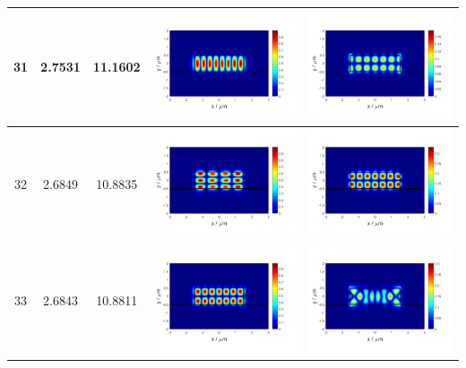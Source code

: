 \documentclass{assignment}
\begin{document}
\begin{sol}
\begin{itemize}
\begin{longtable}[c]{|c|c|c|c|c|}
            31 & 2.7531 & 11.1602 & \includegraphics[width=.3\columnwidth]{Assignment-2-mode-31-Ex.png} & \includegraphics[width=.3\columnwidth]{Assignment-2-mode-31-Ey.png} \\ \hline
            32 & 2.6849 & 10.8835 & \includegraphics[width=.3\columnwidth]{Assignment-2-mode-32-Ex.png} & \includegraphics[width=.3\columnwidth]{Assignment-2-mode-32-Ey.png} \\ \hline
            33 & 2.6843 & 10.8811 & \includegraphics[width=.3\columnwidth]{Assignment-2-mode-33-Ex.png} & \includegraphics[width=.3\columnwidth]{Assignment-2-mode-33-Ey.png} \\ \hline

\end{longtable}
\end{itemize}
\end{sol}
\end{document}
